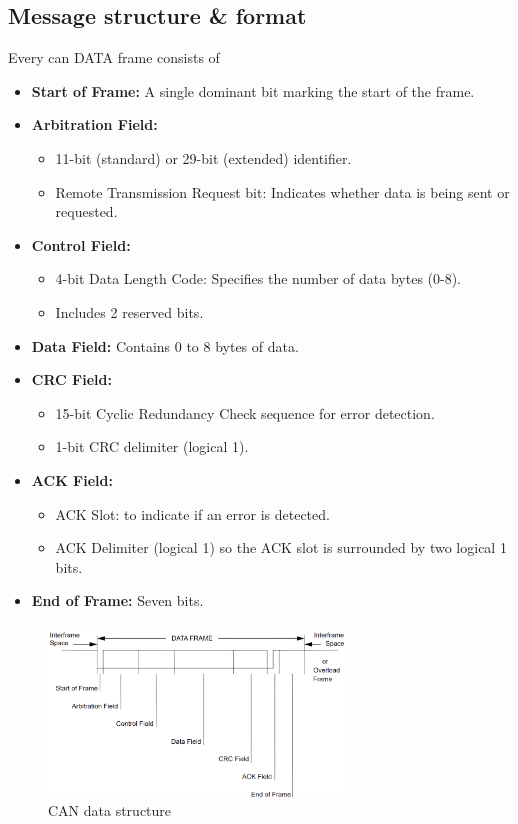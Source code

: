 \subsection{Message structure \& format}
Every \gls{can} DATA frame consists of

\begin{itemize}
  \item \textbf{Start of Frame:} A single dominant bit marking the start of the frame.
  \item \textbf{Arbitration Field:}
        \begin{itemize}
          \item 11-bit (standard) or 29-bit (extended) identifier.
          \item Remote Transmission Request bit: Indicates whether data is being sent or requested.
        \end{itemize}
  \item \textbf{Control Field:}
        \begin{itemize}
          \item 4-bit Data Length Code: Specifies the number of data bytes (0-8).
          \item Includes 2 reserved bits.
        \end{itemize}
  \item \textbf{Data Field:} Contains 0 to 8 bytes of data.
  \item \textbf{CRC Field:}
        \begin{itemize}
          \item 15-bit Cyclic Redundancy Check sequence for error detection.
          \item 1-bit CRC delimiter (logical 1).
        \end{itemize}
  \item \textbf{ACK Field:}
        \begin{itemize}
          \item ACK Slot: to indicate if an error is detected.
          \item ACK Delimiter (logical 1) so the ACK slot is surrounded by two logical 1 bits.
        \end{itemize}
  \item \textbf{End of Frame:} Seven bits.
\end{itemize}

\begin{figure}[H]
  \centering
  \includegraphics[width=0.7\textwidth]{imgs/can_data_structure.png}
  \caption{CAN data structure~\cite{bosch1991can}}
  \label{fig:candata}
\end{figure}

